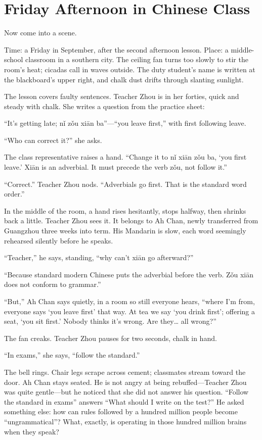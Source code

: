 \section{Friday Afternoon in Chinese Class}
Now come into a scene.

Time: a Friday in September, after the second afternoon lesson. Place: a middle-school classroom in a southern city. The ceiling fan turns too slowly to stir the room's heat; cicadas call in waves outside. The duty student's name is written at the blackboard's upper right, and chalk dust drifts through slanting sunlight.

The lesson covers faulty sentences. Teacher Zhou is in her forties, quick and steady with chalk. She writes a question from the practice sheet:

``It's getting late; nǐ zǒu xiān ba''---``you leave first,'' with first following leave.

``Who can correct it?'' she asks.

The class representative raises a hand. ``Change it to nǐ xiān zǒu ba, `you first leave.' Xiān is an adverbial. It must precede the verb zǒu, not follow it.''

``Correct.'' Teacher Zhou nods. ``Adverbials go first. That is the standard word order.''

In the middle of the room, a hand rises hesitantly, stops halfway, then shrinks back a little. Teacher Zhou sees it. It belongs to Ah Chan, newly transferred from Guangzhou three weeks into term. His Mandarin is slow, each word seemingly rehearsed silently before he speaks.

``Teacher,'' he says, standing, ``why can't xiān go afterward?''

``Because standard modern Chinese puts the adverbial before the verb. Zǒu xiān does not conform to grammar.''

``But,'' Ah Chan says quietly, in a room so still everyone hears, ``where I'm from, everyone says `you leave first' that way. At tea we say `you drink first'; offering a seat, `you sit first.' Nobody thinks it's wrong. Are they\ldots{} all wrong?''

The fan creaks. Teacher Zhou pauses for two seconds, chalk in hand.

``In exams,'' she says, ``follow the standard.''

The bell rings. Chair legs scrape across cement; classmates stream toward the door. Ah Chan stays seated. He is not angry at being rebuffed---Teacher Zhou was quite gentle---but he noticed that she did not answer his question. ``Follow the standard in exams'' answers ``What should I write on the test?'' He asked something else: how can rules followed by a hundred million people become ``ungrammatical''? What, exactly, is operating in those hundred million brains when they speak?

